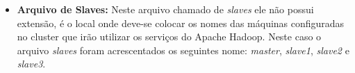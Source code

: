 \begin{itemize}

\item \textbf{Arquivo de Slaves:} Neste arquivo chamado de \textit{slaves} ele não possui extensão, é o local onde deve-se colocar os nomes das máquinas configuradas no cluster que irão utilizar os serviços do Apache Hadoop. Neste caso o arquivo \textit{slaves} foram acrescentados os seguintes nome: \textit{master}, \textit{slave1}, \textit{slave2} e \textit{slave3}.

\end{itemize}

